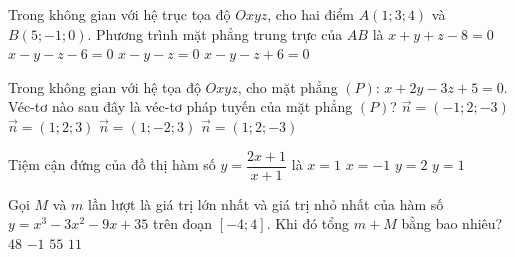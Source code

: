 \begin{ex}%
	Trong không gian với hệ trục tọa độ  $Oxyz$, cho hai điểm  $A(1;3;4)$ và $B(5;-1;0)$. Phương trình mặt phẳng trung trực của $AB$ là
	\choice
	{$x+y+z-8=0$}
	{$x-y-z-6=0$}
	{\True $x-y-z=0$}
	{$x-y-z+6=0$}
\end{ex}
\begin{ex}%
	Trong không gian với hệ tọa độ  $Oxyz$, cho mặt phẳng $(P)$: $x+2y-3z+5=0$. Véc-tơ nào sau đây là véc-tơ pháp tuyến của mặt phẳng  $(P)$?
	\choice
	{$\vec{n}=(-1;2;-3)$}
	{$\vec{n}=(1;2;3)$}
	{$\vec{n}=(1;-2;3)$}
	{\True $\vec{n}=(1;2;-3)$}
\end{ex}
\begin{ex}%
	Tiệm cận đứng của đồ thị hàm số $y=\dfrac{2x+1}{x+1}$ là
	\choice
	{$x=1$}
	{\True $x=-1$}
	{$y=2$}
	{$y=1$}
\end{ex}
\begin{ex}%
	Gọi $M$  và $m$  lần lượt là giá trị lớn nhất và giá trị nhỏ nhất của hàm số $y=x^3-3x^2-9x+35$  trên đoạn $[-4;4]$. Khi đó tổng $m+M$  bằng bao nhiêu?
	\choice
	{$48$}
	{\True $-1$}
	{$55$}
	{$11$}
\end{ex}
